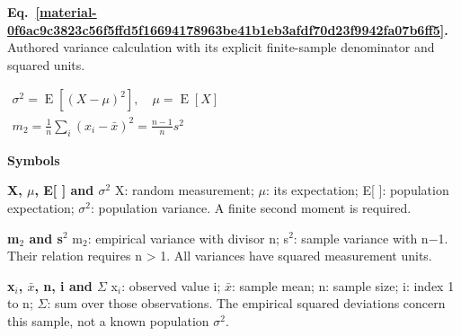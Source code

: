 \documentclass[11pt,a4paper]{article}
\begin{document}
\par\medskip
\noindent\begin{minipage}{\linewidth}
\label{material-0f6ac9c3823c56f5ffd5f16694178963be41b1eb3afdf70d23f9942fa07b6ff5}
\noindent\textbf{Eq.~\ref*{material-0f6ac9c3823c56f5ffd5f16694178963be41b1eb3afdf70d23f9942fa07b6ff5}.} Authored variance calculation with its explicit finite-sample denominator and squared units.\par\nopagebreak
\begin{center}\begin{adjustbox}{max width=\linewidth}$\displaystyle \begin{gathered}\sigma^2=\operatorname{E}[(X-\mu)^2],\quad\mu=\operatorname{E}[X]\\m_2=\frac1n\sum_i(x_i-\bar{x})^2=\frac{n-1}{n}s^2\end{gathered}$\end{adjustbox}\end{center}

\par\noindent\textbf{Symbols}

\par\noindent\textbf{X, \ensuremath{\mu}, E[ ] and \ensuremath{\sigma}\ensuremath{{}^2}} X: random measurement; \ensuremath{\mu}: its expectation; E[ ]: population expectation; \ensuremath{\sigma}\ensuremath{{}^2}: population variance. A finite second moment is required.

\par\noindent\textbf{m\ensuremath{{}_2} and s\ensuremath{{}^2}} m\ensuremath{{}_2}: empirical variance with divisor n; s\ensuremath{{}^2}: sample variance with n\ensuremath{-}1. Their relation requires n > 1. All variances have squared measurement units.

\par\noindent\textbf{x\ensuremath{{}_i}, \ensuremath{\bar{x}}, n, i and \ensuremath{\Sigma}} x\ensuremath{{}_i}: observed value i; \ensuremath{\bar{x}}: sample mean; n: sample size; i: index 1 to n; \ensuremath{\Sigma}: sum over those observations. The empirical squared deviations concern this sample, not a known population \ensuremath{\sigma}\ensuremath{{}^2}.

\end{minipage}\par
\medskip
\end{document}
